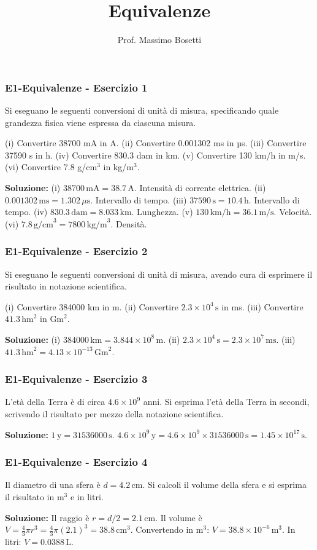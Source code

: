 \documentclass{beamer}
\title{Equivalenze}
\subtitle{}
\author{Prof. Massimo Bosetti}
\institute{Liceo da Vinci}
\date{}
\begin{document}
\begin{frame}[fragile]
\frametitle{E1-Equivalenze - Esercizio 1}
Si eseguano le seguenti conversioni di unità di misura, specificando quale grandezza fisica viene espressa da ciascuna misura.

(i) Convertire 38700 mA in A.  
(ii) Convertire 0.001302 ms in µs.  
(iii) Convertire 37590 s in h.  
(iv) Convertire 830.3 dam in km.  
(v) Convertire 130 km/h in m/s.  
(vi) Convertire 7.8 g/cm\(^3\) in kg/m\(^3\).

\textbf{Soluzione:}  
(i) \(38700 \, \text{mA} = 38.7 \, \text{A}\). Intensità di corrente elettrica.  
(ii) \(0.001302 \, \text{ms} = 1.302 \, \mu\text{s}\). Intervallo di tempo.  
(iii) \(37590 \, \text{s} = 10.4 \, \text{h}\). Intervallo di tempo.  
(iv) \(830.3 \, \text{dam} = 8.033 \, \text{km}\). Lunghezza.  
(v) \(130 \, \text{km/h} = 36.1 \, \text{m/s}\). Velocità.  
(vi) \(7.8 \, \text{g/cm}^3 = 7800 \, \text{kg/m}^3\). Densità.
\end{frame}

\begin{frame}[fragile]
\frametitle{E1-Equivalenze - Esercizio 2}
Si eseguano le seguenti conversioni di unità di misura, avendo cura di esprimere il risultato in notazione scientifica.

(i) Convertire 384000 km in m.  
(ii) Convertire \(2.3 \times 10^4 \, \text{s}\) in ms.  
(iii) Convertire \(41.3 \, \text{hm}^2\) in \( \text{Gm}^2\).

\textbf{Soluzione:}  
(i) \(384000 \, \text{km} = 3.844 \times 10^8 \, \text{m}\).  
(ii) \(2.3 \times 10^4 \, \text{s} = 2.3 \times 10^7 \, \text{ms}\).  
(iii) \(41.3 \, \text{hm}^2 = 4.13 \times 10^{-13} \, \text{Gm}^2\).
\end{frame}

\begin{frame}[fragile]
\frametitle{E1-Equivalenze - Esercizio 3}
L’età della Terra è di circa \(4.6 \times 10^9\) anni. Si esprima l’età della Terra in secondi, scrivendo il risultato per mezzo della notazione scientifica.

\textbf{Soluzione:}  
\(1 \, \text{y} = 31536000 \, \text{s}\).  
\(4.6 \times 10^9 \, \text{y} = 4.6 \times 10^9 \times 31536000 \, \text{s} = 1.45 \times 10^{17} \, \text{s}\).
\end{frame}

\begin{frame}[fragile]
\frametitle{E1-Equivalenze - Esercizio 4}
Il diametro di una sfera è \(d = 4.2 \, \text{cm}\). Si calcoli il volume della sfera e si esprima il risultato in \( \text{m}^3\) e in litri.

\textbf{Soluzione:}  
Il raggio è \(r = d / 2 = 2.1 \, \text{cm}\).  
Il volume è \(V = \frac{4}{3} \pi r^3 = \frac{4}{3} \pi (2.1)^3 = 38.8 \, \text{cm}^3\).  
Convertendo in \( \text{m}^3\): \(V = 38.8 \times 10^{-6} \, \text{m}^3\).  
In litri: \(V = 0.0388 \, \text{L}\).
\end{frame}
\end{document}
